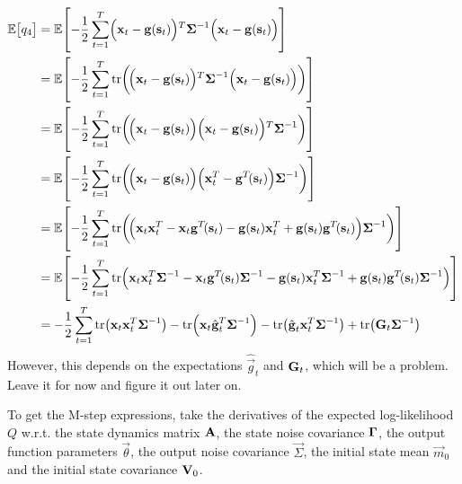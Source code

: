		\begin{align*}
			\E\bracket{q_4}
				&= \E\bracket{-\frac{1}{2} \sum_{t = 1}^{T} \paren{\vec{x}_t - \vec{g}\paren{\vec{s}_t}}^T \mat{\Sigma}^{-1} \paren{\vec{x}_t - \vec{g}\paren{\vec{s}_t}}} \\
				&= \E\bracket{-\frac{1}{2} \sum_{t = 1}^{T} \tr\paren{\!\paren{\vec{x}_t - \vec{g}\paren{\vec{s}_t}}^T \mat{\Sigma}^{-1} \paren{\vec{x}_t - \vec{g}\paren{\vec{s}_t}}}} \\
				&= \E\bracket{-\frac{1}{2} \sum_{t = 1}^{T} \tr\paren{\!\paren{\vec{x}_t - \vec{g}\paren{\vec{s}_t}} \paren{\vec{x}_t - \vec{g}\paren{\vec{s}_t}}^T \mat{\Sigma}^{-1}}} \\
				&= \E\bracket{-\frac{1}{2} \sum_{t = 1}^{T} \tr\paren{\!\paren{\vec{x}_t - \vec{g}\paren{\vec{s}_t}} \paren{\vec{x}_t^T - \vec{g}^T\!\paren{\vec{s}_t}} \mat{\Sigma}^{-1}}} \\
				&= \E\bracket{-\frac{1}{2} \sum_{t = 1}^{T} \tr\paren{\!\paren{ \vec{x}_t \vec{x}_t^T - \vec{x}_t \vec{g}^T\!\paren{\vec{s}_t} - \vec{g}\paren{\vec{s}_t} \vec{x}_t^T + \vec{g}\paren{\vec{s}_t} \vec{g}^T\!\paren{\vec{s}_t} } \mat{\Sigma}^{-1}}} \\
				&= \E\bracket{-\frac{1}{2} \sum_{t = 1}^{T} \tr\paren{ \vec{x}_t \vec{x}_t^T \mat{\Sigma}^{-1} - \vec{x}_t \vec{g}^T\!\paren{\vec{s}_t} \mat{\Sigma}^{-1} - \vec{g}\paren{\vec{s}_t} \vec{x}_t^T \mat{\Sigma}^{-1} + \vec{g}\paren{\vec{s}_t} \vec{g}^T\!\paren{\vec{s}_t} \mat{\Sigma}^{-1} }} \\
				&= -\frac{1}{2} \sum_{t = 1}^{T} \tr\paren{ \vec{x}_t \vec{x}_t^T \mat{\Sigma}^{-1} } - \tr\paren{ \vec{x}_t \hat{\vec{g}}_t^T \mat{\Sigma}^{-1} } - \tr\paren{ \hat{\vec{g}}_t \vec{x}_t^T \mat{\Sigma}^{-1} } + \tr\paren{ \mat{G}_t \mat{\Sigma}^{-1} } \\
		\end{align*}
		However, this depends on the expectations \( \hat{\vec{g}}_t \) and \( \boldsymbol{\mathrm{G}}_t \), which will be a problem. Leave it for now and figure it out later on. %
		
		To get the M-step expressions, take the derivatives of the expected log-likelihood \(Q\) w.r.t. the state dynamics matrix \( \boldsymbol{\mathrm{A}} \), the state noise covariance \( \boldsymbol{\mathrm{\Gamma}} \), the output function parameters \( \vec{\theta} \), the output noise covariance \( \vec{\Sigma} \), the initial state mean \( \vec{m}_0 \) and the initial state covariance \( \boldsymbol{\mathrm{V}}_0 \). %
		
